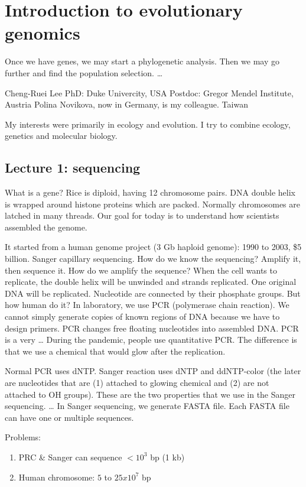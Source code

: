 \documentclass[main.tex]{subfiles}
\begin{document}
\section{Introduction to evolutionary genomics}

Once we have genes, we may start a phylogenetic analysis.
Then we may go further and find the population selection.
…

Cheng-Ruei Lee
PhD: Duke Univercity, USA
Postdoc: Gregor Mendel Institute, Austria
Polina Novikova, now in Germany, is my colleague.
Taiwan

My interests were primarily in ecology and evolution.
I try to combine ecology, genetics and molecular biology.

\subsection{Lecture 1: sequencing}

What is a gene?
Rice is diploid, having 12 chromosome pairs.
DNA double helix is wrapped around histone proteins which are packed.
Normally chromosomes are latched in many threads.
Our goal for today is to understand how scientists assembled the genome.

It started from a human genome project (3 Gb haploid genome): 1990 to 2003, \$5 billion.
Sanger capillary sequencing. How do we know the sequencing? Amplify it, then sequence it.
How do we amplify the sequence? When the cell wants to replicate, the double helix will be unwinded and strands replicated. One original DNA will be replicated.
Nucleotide are connected by their phosphate groups.
But how human do it? In laboratory, we use PCR (polymerase chain reaction). We cannot simply generate copies of known regions of DNA because we have to design primers.
PCR changes free floating nucleotides into assembled DNA.
PCR is a very …
During the pandemic, people use quantitative PCR. The difference is that we use a chemical that would glow after the replication.

Normal PCR uses dNTP. Sanger reaction uses dNTP and ddNTP-color (the later are nucleotides that are (1) attached to glowing chemical and (2) are not attached to OH groups). These are the two properties that we use in the Sanger sequencing.
…
In Sanger sequencing, we generate FASTA file.
Each FASTA file can have one or multiple sequences.

Problems:
\begin{enumerate}[noitemsep]
    \item PRC \& Sanger can sequence $ < 10^3 $ bp (1 kb)
    \item Human chromosome: $ 5 $ to $ 25 x 10^7 $ bp
\end{enumerate}
\end{document}
